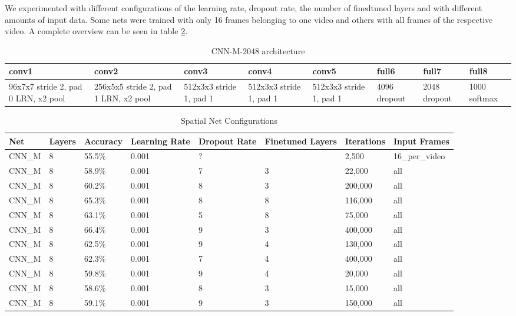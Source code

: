 We experimented with different configurations of the learning rate, dropout rate, the number of finedtuned layers and with different amounts of input data. Some nets were trained with only 16 frames belonging to one video and others with all frames of the respective video. A complete overview can be seen in table \ref{table:spatial_results}.

\begin{table}[H]
\centering
\caption{CNN-M-2048 architecture}
\label{table:cnn-m-208}
\begin{tabularx}{\textwidth}{XXXXXXXX}
\toprule
conv1 & conv2 & conv3 & conv4 & conv5 & full6  & full7 & full8 \\ \midrule
96x7x7  stride 2, pad 0  LRN, x2 pool  &
256x5x5 stride 2, pad 1  LRN, x2 pool  &
512x3x3 stride 1, pad 1   &
512x3x3 stride 1, pad 1   &
512x3x3 stride 1, pad 1   &
4096  dropout  &
2048  dropout  &
1000  softmax  \\
\bottomrule
\end{tabularx}
\end{table}

\begin{table}[H]
\centering
\caption{Spatial Net Configurations}
\label{table:spatial_results}
\begin{tabularx}{\textwidth}{XXXXXXXX}
\toprule
Net 		& Layers	& Accuracy	& Learning Rate 	& Dropout Rate	& Finetuned Layers	& Iterations	& Input Frames\\ \midrule

CNN\_M & 8 & 55.5\%     &  0.001 &  ? &   & 2,500     & 16\_per\_video \\
CNN\_M & 8 & 58.9\%     &  0.001 &  7 & 3 & 22,000    & all \\
CNN\_M & 8 & 60.2\%     &  0.001 &  8 & 3 & 200,000   & all \\
CNN\_M & 8 & 65.3\%     &  0.001 &  8 & 8 & 116,000   & all \\
CNN\_M & 8 & 63.1\%     &  0.001 &  5 & 8 & 75,000    & all \\
CNN\_M & 8 & 66.4\%     &  0.001 &  9 & 3 & 400,000   & all \\
CNN\_M & 8 & 62.5\%     &  0.001 &  9 & 4 & 130,000   & all \\
CNN\_M & 8 & 62.3\%     &  0.001 &  7 & 4 & 400,000   & all \\
CNN\_M & 8 & 59.8\%     &  0.001 &  9 & 4 & 20,000    & all \\
CNN\_M & 8 & 58.6\%     &  0.001 &  8 & 3 & 15,000    & all \\
CNN\_M & 8 & 59.1\%     &  0.001 &  9 & 3 & 150,000   & all \\

\bottomrule
\end{tabularx}
\end{table}


